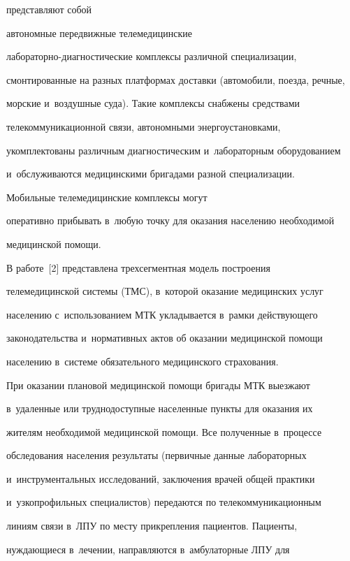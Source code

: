 пред\-став\-ля\-ют собой 


автономные передвижные телемедицинские  


ла\-бо\-ра\-тор\-но-диагно\-сти\-че\-ские комплексы различной специализации, 


смонтированные на разных платформах доставки (автомобили, поезда, речные, 


морские и~воздушные суда). Такие комплексы снабжены средствами 


телекоммуникационной связи, автономными энергоустановками, 


укомплектованы различным диагностическим и~лабораторным оборудованием 


и~обслуживаются медицинскими бригадами разной специализации.


Мобильные телемедицинские комплексы  могут 


оперативно прибывать в~любую точку для оказания населению необходимой 


медицинской помощи.


  


  В работе~[2] представлена трехсегментная модель построения 


телемедицинской системы (ТМС), в~которой оказание медицинских услуг 


населению с~использованием МТК укладывается в~рамки действующего 


законодательства и~нормативных актов об оказании медицинской помощи 


населению в~системе обязательного медицинского страхования. 


  


  При оказании плановой медицинской помощи бригады МТК выезжают 


в~удаленные или труднодоступные населенные пункты для оказания их 


жителям необходимой медицинской помощи. Все полученные в~процессе 


обследования населения результаты (первичные данные лабораторных 


и~инструментальных исследований, заключения врачей общей практики 


и~узкопрофильных специалистов) передаются по телекоммуникационным 


линиям связи в~ЛПУ по месту прикрепления пациентов. Пациенты, 


нуждающиеся в~лечении, направляются в~амбулаторные ЛПУ для 



